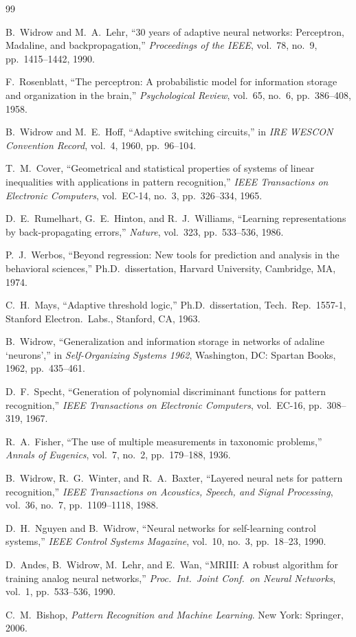 \documentclass[11pt,a4paper]{article}
\begin{document}
\begin{thebibliography}{99}

B.~Widrow and M.~A.~Lehr,
``30 years of adaptive neural networks: Perceptron, Madaline, and backpropagation,''
\textit{Proceedings of the IEEE}, vol.~78, no.~9, pp.~1415--1442, 1990.

F.~Rosenblatt,
``The perceptron: A probabilistic model for information storage and organization in the brain,''
\textit{Psychological Review}, vol.~65, no.~6, pp.~386--408, 1958.

B.~Widrow and M.~E.~Hoff,
``Adaptive switching circuits,''
in \textit{IRE WESCON Convention Record}, vol.~4, 1960, pp.~96--104.

T.~M.~Cover,
``Geometrical and statistical properties of systems of linear inequalities with applications
in pattern recognition,''
\textit{IEEE Transactions on Electronic Computers}, vol.~EC-14, no.~3, pp.~326--334, 1965.

D.~E.~Rumelhart, G.~E.~Hinton, and R.~J.~Williams,
``Learning representations by back-propagating errors,''
\textit{Nature}, vol.~323, pp.~533--536, 1986.

P.~J.~Werbos,
``Beyond regression: New tools for prediction and analysis in the behavioral sciences,''
Ph.D.~dissertation, Harvard University, Cambridge, MA, 1974.

C.~H.~Mays,
``Adaptive threshold logic,''
Ph.D.~dissertation, Tech.~Rep.~1557-1, Stanford Electron.~Labs., Stanford, CA, 1963.

B.~Widrow,
``Generalization and information storage in networks of adaline `neurons','' in
\textit{Self-Organizing Systems 1962}, Washington, DC: Spartan Books, 1962, pp.~435--461.

D.~F.~Specht,
``Generation of polynomial discriminant functions for pattern recognition,''
\textit{IEEE Transactions on Electronic Computers}, vol.~EC-16, pp.~308--319, 1967.

R.~A.~Fisher,
``The use of multiple measurements in taxonomic problems,''
\textit{Annals of Eugenics}, vol.~7, no.~2, pp.~179--188, 1936.

B.~Widrow, R.~G.~Winter, and R.~A.~Baxter,
``Layered neural nets for pattern recognition,''
\textit{IEEE Transactions on Acoustics, Speech, and Signal Processing}, vol.~36, no.~7,
pp.~1109--1118, 1988.

D.~H.~Nguyen and B.~Widrow,
``Neural networks for self-learning control systems,''
\textit{IEEE Control Systems Magazine}, vol.~10, no.~3, pp.~18--23, 1990.

D.~Andes, B.~Widrow, M.~Lehr, and E.~Wan,
``MRIII: A robust algorithm for training analog neural networks,''
\textit{Proc.~Int.~Joint Conf.~on Neural Networks}, vol.~1, pp.~533--536, 1990.

C.~M.~Bishop,
\textit{Pattern Recognition and Machine Learning}.
New York: Springer, 2006.

\end{thebibliography}
\end{document}
